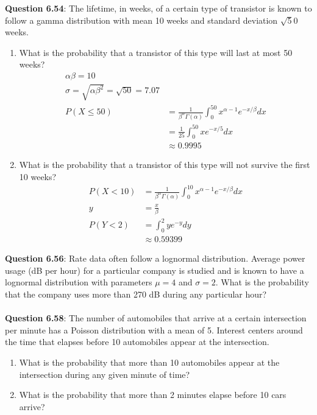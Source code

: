 \documentclass{article}
\begin{document}
    \noindent\textbf{Question 6.54}: The lifetime, in weeks, of a certain type of 
    transistor is known to follow a gamma distribution with mean 10 weeks and standard 
    deviation $\sqrt50$ weeks.
        \begin{enumerate}[label = (\alph*) ]
            \item What is the probability that a transistor of this type will last at 
            most 50 weeks?
                \begin{align*}
                    \alpha\beta = 10\\
                    \sigma = \sqrt{\alpha\beta^2} = \sqrt{50} = 7.07\\
                    P(X\leq 50) &= \frac{1}{\beta^\alpha\Gamma(\alpha)}\int_0^{50}x^{\alpha-1}e^{-x/\beta}dx\\
                                &= \frac{1}{25}\int_0^{50} xe^{-x/5}dx\\
                                &\approx 0.9995
                \end{align*}
            \item  What is the probability that a transistor of this type will not 
            survive the first 10 weeks?
                \begin{align*}
                    P(X<10) &= \frac{1}{\beta^\alpha\Gamma(\alpha)}\int_0^{10}x^{\alpha - 1}e^{-x/\beta}dx \\
                    y &= \frac{x}{\beta}\\
                    P(Y < 2) &= \int_0^2ye^{-y}dy\\
                    &\approx 0.59399
                \end{align*}
        \end{enumerate}
    
    \noindent\textbf{Question 6.56}: Rate data often follow a lognormal distribution.
    Average power usage (dB per hour) for a particular company is studied and is known 
    to have a lognormal distribution with parameters $\mu = 4$ and $\sigma = 2$. What
    is the probability that the company uses more than 270 dB during any particular hour?\\\\
    
    \noindent\textbf{Question 6.58}: The number of automobiles that arrive at a certain 
    intersection per minute has a Poisson distribution with a mean of 5. Interest centers 
    around the time that elapses before 10 automobiles appear at the intersection.
        \begin{enumerate}[label = (\alph*) ]
            \item What is the probability that more than 10 automobiles appear at the 
            intersection during any given minute of time?
            \item What is the probability that more than 2 minutes elapse before 10 
            cars arrive?
        \end{enumerate}
\end{document}
